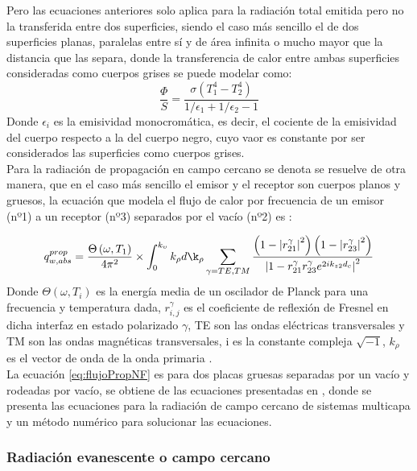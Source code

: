  Pero las ecuaciones anteriores solo aplica para la radiación total emitida pero no la transferida entre dos superficies, siendo el caso más sencillo el de dos superficies planas, paralelas entre sí y de área infinita o mucho mayor que la distancia que las separa, donde la transferencia de calor entre ambas superficies consideradas como cuerpos grises se puede modelar como:
\begin{equation}
\frac{\Phi}{S}=\frac{\sigma \left( T_1^4 -T_2^4 \right)}{1/\epsilon_1 +1/\epsilon_2 -1}
\label{eq:flujoCalorSuperficiesGrises}
\end{equation}
Donde $\epsilon_i$ es la emisividad monocromática, es decir, el cociente de la emisividad del cuerpo respecto a la del cuerpo negro, cuyo vaor es constante por ser considerados las superficies como cuerpos grises.\\

Para la radiación de propagación en campo cercano se denota se resuelve de otra manera, que en el caso más sencillo el emisor y el receptor son cuerpos planos y gruesos, la ecuación que modela el flujo de calor por frecuencia de un emisor (nº1) a un receptor (nº3) separados por el vacío (nº2) es \cite{nfTPV_equations}:

\begin{equation}
q_{w,abs}^{prop}=\dfrac{\Theta \left( \omega,T_1 \right)}{4 \pi^2}\times \int^{k_\upsilon}_{0} k_\rho d\k_\rho \sum_{\gamma=TE,TM}\dfrac{\left( 1- \left| r_{21}^\gamma \right|^2\right) \left( 1-  \left| r_{23}^\gamma \right|^2 \right)}{\left| 1- r_{21}^\gamma r_{23}^\gamma e^{2ik_{z2}d_{c}} \right|^2}
\label{eq:flujoPropNF}
\end{equation}
Donde $\Theta \left( \omega,T_i \right)$ es la energía media de un oscilador de Planck para una frecuencia y temperatura dada, $r_{i,j}^\gamma$ es el coeficiente de reflexión de Fresnel en dicha interfaz en estado polarizado $\gamma$, TE son las ondas eléctricas transversales y TM son las ondas magnéticas transversales, i es la constante compleja $\sqrt{-1}$, $k_\rho$ es el vector de onda de la onda primaria \cite{nfTPV_fullEquations}.\\

La ecuación \ref{eq:flujoPropNF} es para dos placas gruesas separadas por un vacío y rodeadas por vacío, se obtiene de las ecuaciones presentadas en \cite{nfTPV_fullEquations}, donde se presenta las ecuaciones para la radiación de campo cercano de sistemas multicapa y un método numérico para solucionar las ecuaciones.

\subsubsection{Radiación evanescente o campo cercano}

